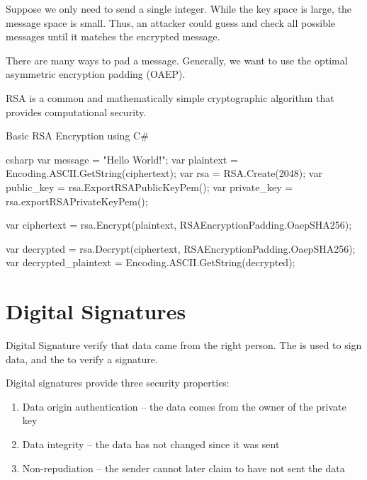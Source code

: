 \documentclass[12pt]{report}
\begin{document}
Suppose we only need to send a single integer. While the key space is large, the message space is small. Thus, an attacker could guess and check all possible messages until it matches the encrypted message.

There are many ways to pad a message. Generally, we want to use the optimal asymmetric encryption padding (OAEP).

\begin{dfnbox}{RSA}{}
     is a common and mathematically simple cryptographic algorithm that provides computational security.
\end{dfnbox}

\begin{codebox}{Basic RSA Encryption using C\#}{}{}
    \begin{amzcode}{csharp}
        var message = "Hello World!";
        var plaintext = Encoding.ASCII.GetString(ciphertext);
        var rsa = RSA.Create(2048);
        var public_key = rsa.ExportRSAPublicKeyPem();
        var private_key = rsa.exportRSAPrivateKeyPem();

        var ciphertext = rsa.Encrypt(plaintext, RSAEncryptionPadding.OaepSHA256);

        var decrypted = rsa.Decrypt(ciphertext, RSAEncryptionPadding.OaepSHA256);
        var decrypted_plaintext = Encoding.ASCII.GetString(decrypted);
    \end{amzcode}
\end{codebox}

\section{Digital Signatures}

\begin{dfnbox}{Digital Signature}{}
     verify that data came from the right person. The  is used to sign data, and the  to verify a signature.
\end{dfnbox}

Digital signatures provide three security properties:
\begin{enumerate}[noitemsep]
    \item Data origin authentication -- the data comes from the owner of the private key
    \item Data integrity -- the data has not changed since it was sent
    \item Non-repudiation -- the sender cannot later claim to have not sent the data
\end{enumerate}
\end{document}
